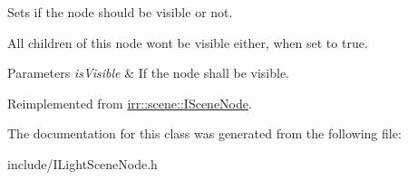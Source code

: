 Sets if the node should be visible or not. 

All children of this node won\textquotesingle{}t be visible either, when set to true. 
\begin{DoxyParams}{Parameters}
{\em is\+Visible} & If the node shall be visible. \\
\hline
\end{DoxyParams}


Reimplemented from \hyperlink{classirr_1_1scene_1_1ISceneNode_a7a5de878c7084088646f07afaac0a73f}{irr\+::scene\+::\+I\+Scene\+Node}.



The documentation for this class was generated from the following file\+:\begin{DoxyCompactItemize}
\item 
include/I\+Light\+Scene\+Node.\+h\end{DoxyCompactItemize}
